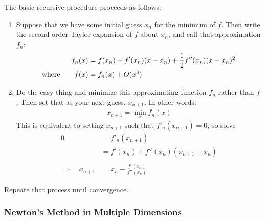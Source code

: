 \documentclass[a4paper,12pt]{scrartcl}
\theoremstyle{definition}
\theoremstyle{remark}
\begin{document}
The basic recursive procedure proceeds as follows:
\begin{enumerate}
  \item Suppose that we have some initial guess $x_n$ for the minimum of
    $f$. Then write the second-order Taylor expansion of $f$ about
    $x_n$, and call that approximation $f_n$:
    \begin{align}
      f_n(x) &= f(x_n) + f'(x_n)(x-x_n) + \frac{1}{2} f''(x_n) (x-x_n)^2\\
      \text{where} \qquad
      f(x) &= f_n(x) + O(x^3)\notag
    \end{align}
  \item Do the easy thing and minimize this approximating function $f_n$
    rather than $f$. Then set that as your next guess, $x_{n+1}$. In
    other words:
    \begin{align*}
      x_{n+1} = \min_x f_n(x)
    \end{align*}
    This is equivalent to setting $x_{n+1}$ such that $f'_n(x_{n+1})=0$,
    so solve
    \begin{align*}
      0 &= f'_n(x_{n+1})\\
      &= f'(x_n) + f''(x_n)(x_{n+1}-x_n) \\\\
      \Rightarrow \quad
      x_{n+1} &= x_n - \frac{f'(x_n)}{f''(x_n)}
    \end{align*}
\end{enumerate}
Repeate that process until convergence.


\subsubsection{Newton's Method in Multiple Dimensions}
\end{document}
